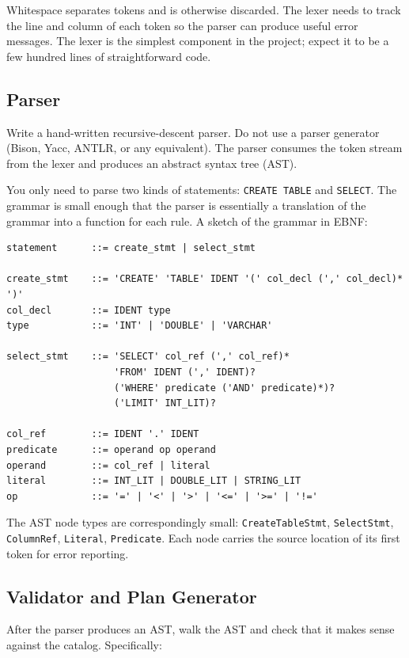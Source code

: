 \documentclass[11pt,a4paper]{article}
\begin{document}
Whitespace separates tokens and is otherwise discarded. The lexer needs to track the line and column of each token so the parser can produce useful error messages. The lexer is the simplest component in the project; expect it to be a few hundred lines of straightforward code.

\subsection{Parser}
Write a hand-written recursive-descent parser. Do not use a parser generator (Bison, Yacc, ANTLR, or any equivalent). The parser consumes the token stream from the lexer and produces an abstract syntax tree (AST).

You only need to parse two kinds of statements: \texttt{CREATE TABLE} and \texttt{SELECT}. The grammar is small enough that the parser is essentially a translation of the grammar into a function for each rule. A sketch of the grammar in EBNF:

\begin{codebox}
\begin{lstlisting}
statement      ::= create_stmt | select_stmt

create_stmt    ::= 'CREATE' 'TABLE' IDENT '(' col_decl (',' col_decl)* ')'
col_decl       ::= IDENT type
type           ::= 'INT' | 'DOUBLE' | 'VARCHAR'

select_stmt    ::= 'SELECT' col_ref (',' col_ref)*
                   'FROM' IDENT (',' IDENT)?
                   ('WHERE' predicate ('AND' predicate)*)?
                   ('LIMIT' INT_LIT)?

col_ref        ::= IDENT '.' IDENT
predicate      ::= operand op operand
operand        ::= col_ref | literal
literal        ::= INT_LIT | DOUBLE_LIT | STRING_LIT
op             ::= '=' | '<' | '>' | '<=' | '>=' | '!='
\end{lstlisting}
\end{codebox}

The AST node types are correspondingly small: \texttt{CreateTableStmt}, \texttt{SelectStmt}, \texttt{ColumnRef}, \texttt{Literal}, \texttt{Predicate}. Each node carries the source location of its first token for error reporting.

\subsection{Validator and Plan Generator}
After the parser produces an AST, walk the AST and check that it makes sense against the catalog. Specifically:
\end{document}
